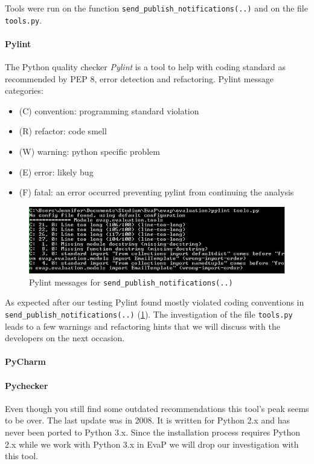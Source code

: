 Tools were run on the function \texttt{send\_publish\_notifications(..)} and on the file \texttt{tools.py}.

\paragraph{Pylint}
The Python quality checker \emph{Pylint} is a tool to help with coding standard as recommended by PEP 8, error detection and refactoring.
Pylint message categories:
\begin{itemize}
    \item (C) convention: programming standard violation
    \item (R) refactor: code smell
    \item (W) warning: python specific problem
    \item (E) error: likely bug
    \item (F) fatal: an error occurred preventing pylint from continuing the analysis
\end{itemize}
\begin{figure}[h]
    \centering
    \includegraphics[width=\textwidth, keepaspectratio]{graphics/pylint_send_publish_notifications_1}
    \caption{Pylint messages for \texttt{send\_publish\_notifications(..)}}
    \label{fig:pylint}
\end{figure} 
As expected after our testing Pylint found mostly violated coding conventions in \texttt{send\_publish\_notifications(..)} (\ref{fig:pylint}). 
The investigation of the file \texttt{tools.py} leads to a few warnings and refactoring hints that we will discuss with the developers on the next occasion.


\paragraph{PyCharm}

\paragraph{Pychecker}
Even though you still find some outdated recommendations this tool's peak seems to be over. 
The last update was in 2008.
It is written for Python 2.x and has never been ported to Python 3.x.
Since the installation process requires Python 2.x while we work with Python 3.x in EvaP we will drop our investigation with this tool.

